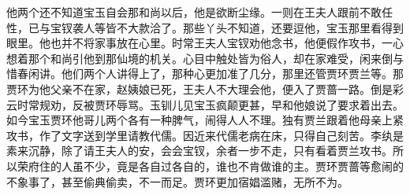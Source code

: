 \begin{parag}
    他两个还不知道宝玉自会那和尚以后，他是欲断尘缘。一则在王夫人跟前不敢任性，已与宝钗袭人等皆不大款洽了。那些丫头不知道，还要逗他，宝玉那里看得到眼里。他也并不将家事放在心里。时常王夫人宝钗劝他念书，他便假作攻书，一心想着那个和尚引他到那仙境的机关。心目中触处皆为俗人，却在家难受，闲来倒与惜春闲讲。他们两个人讲得上了，那种心更加准了几分，那里还管贾环贾兰等。那贾环为他父亲不在家，赵姨娘已死，王夫人不大理会他，便入了贾蔷一路。倒是彩云时常规劝，反被贾环辱骂。玉钏儿见宝玉疯颠更甚，早和他娘说了要求着出去。如今宝玉贾环他哥儿两个各有一种脾气，闹得人人不理。独有贾兰跟着他母亲上紧攻书，作了文字送到学里请教代儒。因近来代儒老病在床，只得自己刻苦。李纨是素来沉静，除了请王夫人的安，会会宝钗，余者一步不走，只有看着贾兰攻书。所以荣府住的人虽不少，竟是各自过各自的，谁也不肯做谁的主。贾环贾蔷等愈闹的不象事了，甚至偷典偷卖，不一而足。贾环更加宿娼滥赌，无所不为。
\end{parag}



